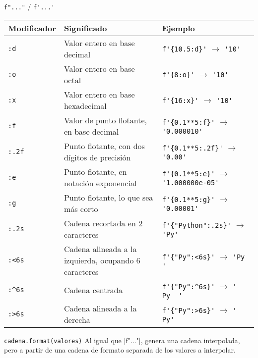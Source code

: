 \begin{referencia_python}
\begin{sintaxis}{\lstinline!f"..."! / \lstinline!f'...'!}
\begin{center}
\begin{tabular}{l p{6cm} l}
 {\bf Modificador} & {\bf Significado} & {\bf Ejemplo} \\
\hline
\verb!:d! & {\footnotesize Valor entero en base decimal} &
  \lstinline!f'{10.5:d}'! $\rightarrow$ \lstinline!'10'! \\
\verb!:o! & {\footnotesize Valor entero en base octal} &
  \lstinline!f'{8:o}'! $\rightarrow$ \lstinline!'10'! \\
\verb!:x! & {\footnotesize Valor entero en base hexadecimal} &
  \lstinline!f'{16:x}'! $\rightarrow$ \lstinline!'10'! \\
\verb!:f! & {\footnotesize Valor de punto flotante, en base decimal} &
  \lstinline!f'{0.1**5:f}'! $\rightarrow$ \lstinline!'0.000010'! \\
\verb!:.2f! & {\footnotesize Punto flotante, con dos dígitos de precisión} &
  \lstinline!f'{0.1**5:.2f}'! $\rightarrow$ \lstinline!'0.00'! \\
\verb!:e! & {\footnotesize Punto flotante, en notación exponencial} &
  \lstinline!f'{0.1**5:e}'! $\rightarrow$ \lstinline!'1.000000e-05'! \\
\verb!:g! & {\footnotesize Punto flotante, lo que sea más corto} &
  \lstinline!f'{0.1**5:g}'! $\rightarrow$ \lstinline!'0.00001'! \\
\verb!:.2s! & {\footnotesize Cadena recortada en 2 caracteres} &
  \lstinline!f'{"Python":.2s}'! $\rightarrow$ \lstinline!'Py'! \\
\verb!:<6s! & {\footnotesize Cadena alineada a la izquierda, ocupando 6 caracteres} &
  \lstinline!f'{"Py":<6s}'! $\rightarrow$ \lstinline!'Py    '! \\
\verb!:^6s! & {\footnotesize Cadena centrada} &
  \lstinline!f'{"Py":^6s}'! $\rightarrow$ \lstinline!'  Py  '! \\
\verb!:>6s! & {\footnotesize Cadena alineada a la derecha} &
  \lstinline!f'{"Py":>6s}'! $\rightarrow$ \lstinline!'    Py'! \\
\end{tabular}
\end{center}
\end{sintaxis}

\begin{sintaxis}{\lstinline!cadena.format(valores)!}
Al igual que |f"..."|, genera una cadena interpolada, pero a partir de una
cadena de formato separada de los valores a interpolar.
\end{sintaxis}


\end{referencia_python}
